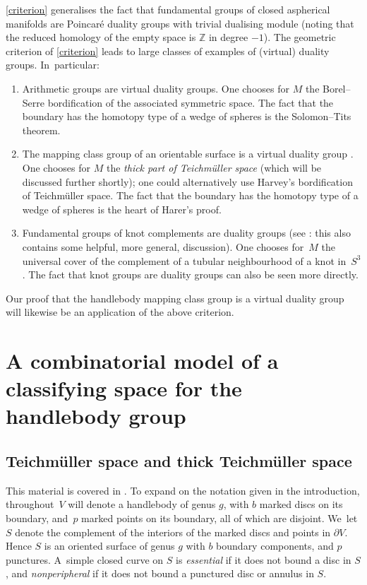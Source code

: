 \documentclass[JEP,XML,SOM,Unicode,NoFloatCountersInSection,published]{cedram}
\theoremstyle{plain}
\theoremstyle{definition}
\newcommand{\Z}{\mathbb Z}
\begin{document}
\cref{criterion} generalises the fact that fundamental groups of closed aspherical manifolds are Poincaré duality groups with trivial dualising module (noting that the reduced homology of the empty space is $\Z$ in degree $-1$). The geometric criterion of \cref{criterion} leads to large classes of examples of (virtual) duality groups. In~particular:
\begin{enumerate}
\item Arithmetic groups are virtual duality groups. One chooses for $M$ the Borel--Serre bordification \cite{borelserre} of the associated symmetric space. The fact that the boundary has the homotopy type of a wedge of spheres is the Solomon--Tits theorem.
\item The mapping class group of an orientable surface is a virtual duality group \cite{harer,ivanov}. One chooses for $M$ the \emph{thick part of Teichmüller space} (which will be discussed further shortly); one could alternatively use Harvey's bordification of Teichmüller space. The fact that the boundary has the homotopy type of a wedge of spheres is the heart of Harer's proof.
\item Fundamental groups of knot complements are duality groups (see \cite[Ex.\,1 in \S VIII.9]{brown2}: this also contains some helpful, more general, discussion). One chooses for~$M$ the universal cover of the complement of a tubular neighbourhood of a knot in~$S^3$. The fact that knot groups are duality groups can also be seen more directly.
\end{enumerate}

Our proof that the handlebody mapping class group is a virtual duality group will likewise be an application of the above criterion.

\section{A combinatorial model of a classifying space for the handlebody group}

\subsection{Teichmüller space and thick Teichmüller space}

This material is covered in \cite[Ch.\,10]{farbmargalit}. To expand on the notation given in the introduction, throughout~$V$ will denote a handlebody of genus $g$, with $b$ marked discs on its boundary, and~$p$ marked points on its boundary, all of which are disjoint. We~let $S$ denote the complement of the interiors of the marked discs and points in $\partial V$. Hence $S$ is an oriented surface of genus $g$ with $b$ boundary components, and $p$ punctures. A~simple closed curve on $S$ is \emph{essential} if it does not bound a disc in $S$, and \emph{nonperipheral} if it does not bound a punctured disc or annulus in $S$.
\end{document}
